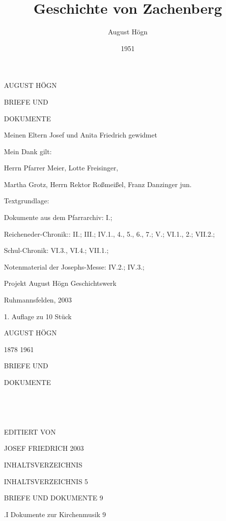 \documentclass[12pt,a4pager]{book}
\author{August Högn}
\title{Geschichte von Zachenberg}
\date{1951}
\begin{document}
\maketitle


AUGUST HÖGN

BRIEFE UND

DOKUMENTE

Meinen Eltern Josef und Anita Friedrich gewidmet


Mein Dank gilt:

Herrn Pfarrer Meier, Lotte Freisinger,

Martha Grotz, Herrn Rektor Roßmeißel, Franz Danzinger jun.



Textgrundlage:

Dokumente aus dem Pfarrarchiv: I.;

Reicheneder-Chronik:: II.; III.; IV.1., 4., 5.,  6.,  7.; V.; VI.1., 2.; VII.2.;

Schul-Chronik: VI.3., VI.4.; VII.1.;

Notenmaterial der Josephs-Messe: IV.2.; IV.3.;


Projekt August Högn Geschichtswerk

Ruhmannsfelden, 2003

1. Auflage zu 10 Stück

AUGUST HÖGN

1878 1961





BRIEFE UND

DOKUMENTE



























EDITIERT VON

JOSEF FRIEDRICH 2003





INHALTSVERZEICHNIS

INHALTSVERZEICHNIS  5

BRIEFE UND DOKUMENTE    9

.I Dokumente zur Kirchenmusik   9
\end{document}
